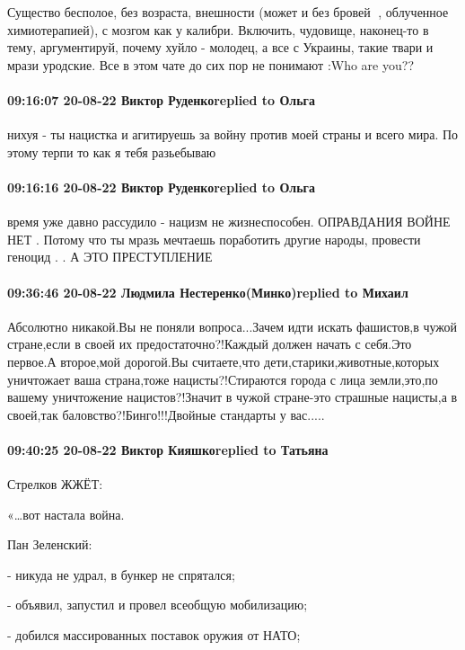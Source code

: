Существо бесполое, без возраста, внешности (может и без бровей 🤣, облученное
химиотерапией), с мозгом как у калибри. Включить, чудовище, наконец-то в тему,
аргументируй, почему хуйло - молодец, а все с Украины, такие твари и мрази
уродские. Все в этом чате до сих пор не понимают :Who are you??

\paragraph{09:16:07 20-08-22 Виктор Руденкоreplied to Ольга}

нихуя - ты нацистка и агитируешь за войну против моей страны и всего мира. По
этому терпи то как я тебя разьебываю

\paragraph{09:16:16 20-08-22 Виктор Руденкоreplied to Ольга}

время уже давно рассудило - нацизм не жизнеспособен.
ОПРАВДАНИЯ ВОЙНЕ НЕТ .
Потому что ты мразь мечтаешь поработить другие народы, провести геноцид
. .
А ЭТО ПРЕСТУПЛЕНИЕ

\paragraph{09:36:46 20-08-22 Людмила Нестеренко(Минко)replied to Михаил}

Абсолютно никакой.Вы не поняли вопроса...Зачем идти искать фашистов,в чужой
стране,если в своей их предостаточно?!Каждый должен начать с себя.Это первое.А
второе,мой дорогой.Вы считаете,что дети,старики,животные,которых уничтожает
ваша страна,тоже нацисты?!Стираются города с лица земли,это,по вашему
уничтожение нацистов?!Значит в чужой стране-это страшные нацисты,а в своей,так
баловство?!Бинго!!!Двойные стандарты у вас.....

\paragraph{09:40:25 20-08-22 Виктор Кияшкоreplied to Татьяна}

Стрелков ЖЖЁТ:

«…вот настала война.

Пан Зеленский:

- никуда не удрал, в бункер не спрятался;

- объявил, запустил и провел всеобщую мобилизацию;

- добился массированных поставок оружия от НАТО;

